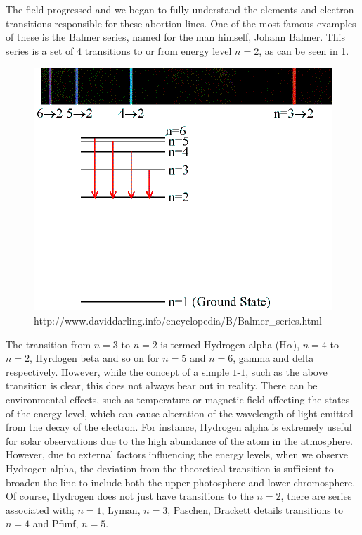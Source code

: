 The field progressed and we began to fully understand the elements and electron transitions responsible for these abortion lines.
One of the most famous examples of these is the Balmer series, named for the man himself, Johann Balmer.
This series is a set of 4 transitions to or from energy level $n = 2$, as can be seen in \ref{fig:balmer}.

\begin{figure}
	\includegraphics{Chapter1/Figs/Balmer_series}
	\caption{http://www.daviddarling.info/encyclopedia/B/Balmer_series.html}
	\label{fig:balmer}
\end{figure}

The transition from $n=3$ to $n=2$ is termed Hydrogen alpha (H$\alpha$), $n=4$ to $n=2$, Hyrdogen beta and so on for $n=5$ and $n=6$, gamma and delta respectively. 
However, while the concept of a simple $1$-$1$, such as the above transition is clear, this does not always bear out in reality.
There can be environmental effects, such as temperature or magnetic field affecting the states of the energy level, which can cause alteration of the wavelength of light emitted from the decay of the electron.
For instance, Hydrogen alpha is extremely useful for solar observations due to the high abundance of the atom in the atmosphere.
However, due to external factors influencing the energy levels, when we observe Hydrogen alpha, the deviation from the theoretical transition is sufficient to broaden the line to include both the upper photosphere and lower chromosphere.
Of course, Hydrogen does not just have transitions to the $n=2$, there are series associated with; $n=1$, Lyman, $n=3$, Paschen, Brackett details transitions to $n=4$ and Pfunf, $n=5$.

